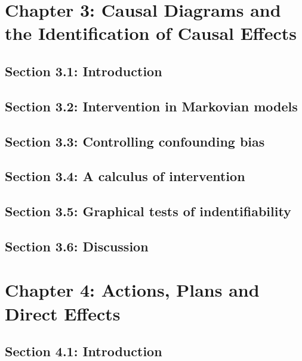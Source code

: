 \documentclass[oneside]{book}
\begin{document}


\chapter{Chapter 3: Causal Diagrams and the Identification of Causal Effects}

\section{Section 3.1: Introduction}



\section{Section 3.2: Intervention in Markovian models}



\section{Section 3.3: Controlling confounding bias}



\section{Section 3.4: A calculus of intervention}



\section{Section 3.5: Graphical tests of indentifiability}



\section{Section 3.6: Discussion}



\chapter{Chapter 4: Actions, Plans and Direct Effects}

\section{Section 4.1: Introduction}
\end{document}
